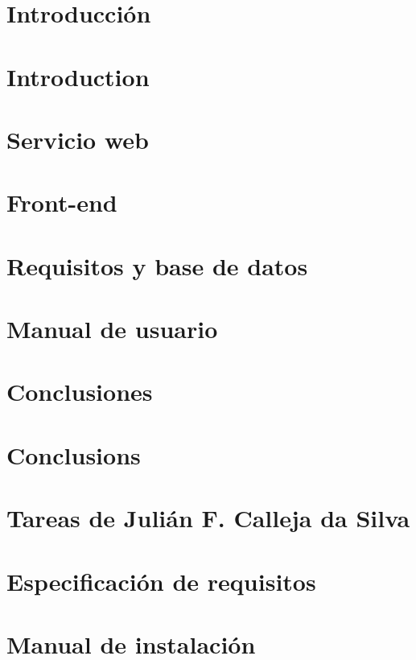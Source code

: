 \documentclass[11pt,a4paper]{article}
\begin{document}
{\clearpage
\tableofcontents
\newpage}

{
\thispagestyle{empty}
\setlength{\parskip}{0.4cm plus4mm minus3mm}


\section{Introducci\'on\label{sec:intro}}


\newpage
\section{Introduction\label{sec:introEn}}


\newpage
\section{Servicio web\label{sec:s_web}}


\newpage
\section{Front-end\label{sec:front}}


\newpage
\section{Requisitos y base de datos\label{sec:req}}



\newpage
\section{Manual de usuario\label{sec:manual}}


\newpage
\section{Conclusiones\label{sec:conc}}


\newpage
\section{Conclusions\label{sec:concEn}}


\newpage
\section{Tareas de Julián F. Calleja da Silva\label{sec:julian}}


\newpage
{\small


}


\newpage
\appendix

\section{Especificación de requisitos\label{app:req}}


\newpage
\section{Manual de instalación\label{app:manual}}

}
\appendix


%
\end{document}
